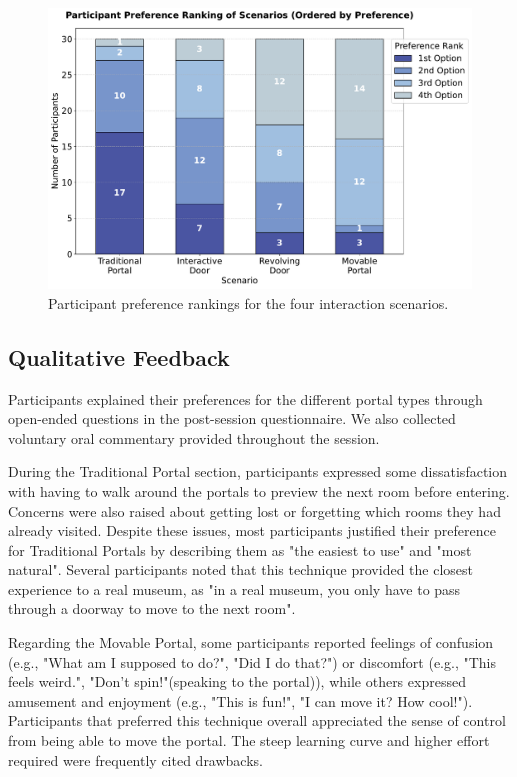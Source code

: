 \begin{figure}[h]
    \centering
    \includegraphics[width=.65\textwidth]{NOVAthesisFiles/Images/graphs/scenario_preference_plot.pdf}
    \caption[Participants preference rankings over portal techniques.]
    {Participant preference rankings for the four interaction scenarios.}
    \label{fig:user-preference}
\end{figure}

\subsection{Qualitative Feedback}

Participants explained their preferences for the different portal types through 
open-ended questions in the post-session questionnaire. We also collected voluntary oral commentary provided throughout the session.

During the Traditional Portal section, participants expressed some dissatisfaction with having to walk around the portals to preview 
the next room before entering. Concerns were also raised about getting lost or forgetting which rooms they had already visited. 
Despite these issues, most participants justified their preference for Traditional Portals by describing them as "the easiest to use" 
and "most natural". Several participants noted that this technique provided the closest experience to a real museum, as "in a real museum, 
you only have to pass through a doorway to move to the next room".

Regarding the Movable Portal, some participants reported feelings of confusion (e.g., "What am I supposed to do?", "Did I do that?") 
or discomfort (e.g., "This feels weird.", "Don't spin!"(speaking to the portal)), while others expressed amusement and enjoyment 
(e.g., "This is fun!", "I can move it? How cool!"). Participants that preferred this technique overall
appreciated the sense of control from being able to move the portal. The steep learning curve and higher effort required were frequently 
cited drawbacks.

